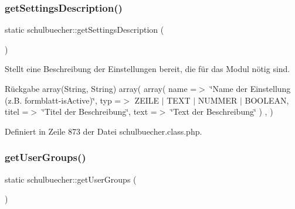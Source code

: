 \mbox{\label{classschulbuecher_a12bf8c79ff6d2b1fe8bf6eb845f87e2d}} 
\subsubsection{\texorpdfstring{get\+Settings\+Description()}{getSettingsDescription()}\hspace{0.1cm}{\footnotesize\ttfamily [2/2]}}
{\footnotesize\ttfamily static schulbuecher\+::get\+Settings\+Description (\begin{DoxyParamCaption}{ }\end{DoxyParamCaption})\hspace{0.3cm}{\ttfamily [static]}}

Stellt eine Beschreibung der Einstellungen bereit, die für das Modul nötig sind. \begin{DoxyReturn}{Rückgabe}
array(\+String, String) array( array( \textquotesingle{}name\textquotesingle{} =$>$ \char`\"{}\+Name der Einstellung (z.\+B. formblatt-\/is\+Active)\char`\"{}, \textquotesingle{}typ\textquotesingle{} =$>$ Z\+E\+I\+LE $\vert$ T\+E\+XT $\vert$ N\+U\+M\+M\+ER $\vert$ B\+O\+O\+L\+E\+AN, \textquotesingle{}titel\textquotesingle{} =$>$ \char`\"{}\+Titel der Beschreibung\char`\"{}, \textquotesingle{}text\textquotesingle{} =$>$ \char`\"{}\+Text der Beschreibung\char`\"{} ) , ) 
\end{DoxyReturn}


Definiert in Zeile 873 der Datei schulbuecher.\+class.\+php.

\mbox{\label{classschulbuecher_aa28fac3077eadbd8c7aed5e26a263508}} 
\subsubsection{\texorpdfstring{get\+User\+Groups()}{getUserGroups()}\hspace{0.1cm}{\footnotesize\ttfamily [1/2]}}
{\footnotesize\ttfamily static schulbuecher\+::get\+User\+Groups (\begin{DoxyParamCaption}{ }\end{DoxyParamCaption})\hspace{0.3cm}{\ttfamily [static]}}

